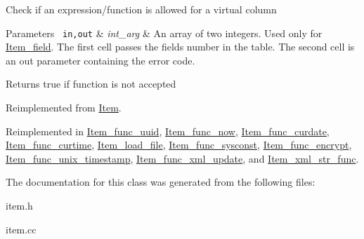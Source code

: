 Check if an expression/function is allowed for a virtual column


\begin{DoxyParams}[1]{Parameters}
\mbox{\texttt{ in,out}}  & {\em int\+\_\+arg} & An array of two integers. Used only for \mbox{\hyperlink{classItem__field}{Item\+\_\+field}}. The first cell passes the field\textquotesingle{}s number in the table. The second cell is an out parameter containing the error code.\\
\hline
\end{DoxyParams}
\begin{DoxyReturn}{Returns}
true if function is not accepted 
\end{DoxyReturn}


Reimplemented from \mbox{\hyperlink{classItem_af75e3659f732265cbe72824803f208f2}{Item}}.



Reimplemented in \mbox{\hyperlink{classItem__func__uuid_a2ffae007bf0712dd82926ee1a994dc70}{Item\+\_\+func\+\_\+uuid}}, \mbox{\hyperlink{classItem__func__now_a724c78088a5de2c85cab8d92f0f8a519}{Item\+\_\+func\+\_\+now}}, \mbox{\hyperlink{classItem__func__curdate_abdf88efdcbd4bf821e4577dcd7765bb9}{Item\+\_\+func\+\_\+curdate}}, \mbox{\hyperlink{classItem__func__curtime_af861f93c4face56168852e5cdb465e43}{Item\+\_\+func\+\_\+curtime}}, \mbox{\hyperlink{classItem__load__file_a1be538400bc26d5fd2f1ee075bb11be5}{Item\+\_\+load\+\_\+file}}, \mbox{\hyperlink{classItem__func__sysconst_afef78b3a992b62b9c1155e0074e8ab72}{Item\+\_\+func\+\_\+sysconst}}, \mbox{\hyperlink{classItem__func__encrypt_a8b948c531a8265980a7be6913f3fe36c}{Item\+\_\+func\+\_\+encrypt}}, \mbox{\hyperlink{classItem__func__unix__timestamp_a326e598d47a54d35b5853e2b121894c2}{Item\+\_\+func\+\_\+unix\+\_\+timestamp}}, \mbox{\hyperlink{classItem__func__xml__update_aef4d74587e25de0b32a863ecc3b27214}{Item\+\_\+func\+\_\+xml\+\_\+update}}, and \mbox{\hyperlink{classItem__xml__str__func_aad586261f128e8819704b29bdf0c0470}{Item\+\_\+xml\+\_\+str\+\_\+func}}.



The documentation for this class was generated from the following files\+:\begin{DoxyCompactItemize}
\item 
item.\+h\item 
item.\+cc\end{DoxyCompactItemize}

